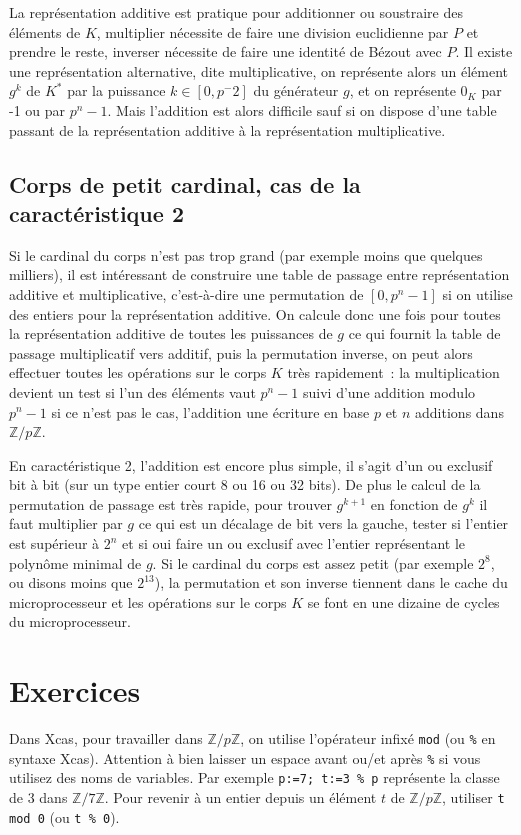 \documentclass[a4paper,11pt]{book}
\begin{document}
\begin{giacjshere}
La repr\'esentation additive est pratique pour additionner
ou soustraire des \'el\'ements de $K$, multiplier
n\'ecessite de faire une division euclidienne par $P$ et prendre
le reste, inverser n\'ecessite de faire une identit\'e de B\'ezout
avec $P$. Il existe une repr\'esentation alternative, dite
multiplicative, on repr\'esente alors un \'el\'ement $g^k$ de $K^*$
par la puissance $k \in [0,p^-2]$ du g\'en\'erateur $g$, et on
repr\'esente $0_K$ par -1 ou par $p^n-1$. Mais l'addition
est alors difficile sauf si on dispose d'une table passant
de la repr\'esentation additive \`a la repr\'esentation
multiplicative.

\subsection{Corps de petit cardinal, cas de la caract\'eristique 2}
Si le cardinal du corps n'est pas trop grand (par exemple
moins que quelques milliers), il est int\'eressant de construire
une table de passage entre repr\'esentation additive et
multiplicative, c'est-\`a-dire une permutation de $[0,p^n-1]$
si on utilise des entiers pour la repr\'esentation additive.
On calcule donc une fois pour toutes la repr\'esentation additive
de toutes les puissances de $g$ ce qui fournit la table de passage
multiplicatif vers additif, puis la permutation inverse, on peut alors
effectuer toutes les op\'erations sur le corps $K$ tr\`es
rapidement~: la multiplication devient un test si l'un
des \'el\'ements vaut $p^n-1$ suivi d'une addition modulo $p^n-1$ si
ce n'est pas le cas, l'addition une \'ecriture en base $p$ et $n$
additions dans $\mathbb{Z}/p\mathbb{Z}$.

En caract\'eristique 2, l'addition est encore plus simple, il s'agit
d'un ou exclusif bit \`a bit (sur un type entier court 8 ou 16 ou 32 bits). 
De plus le calcul de la permutation
de passage est tr\`es rapide, pour trouver $g^{k+1}$ en fonction
de $g^k$ il faut multiplier par $g$ ce qui est un d\'ecalage
de bit vers la gauche, tester si l'entier est sup\'erieur \`a $2^n$
et si oui faire un ou exclusif avec l'entier repr\'esentant le
polyn\^ome minimal de $g$. Si le cardinal du corps est assez petit
(par exemple $2^8$, ou disons moins que $2^{13}$),
la permutation et son inverse tiennent dans le cache du
microprocesseur et les op\'erations sur le corps $K$ se font
en une dizaine de cycles du microprocesseur.

\pagebreak

\section{Exercices}
Dans Xcas, pour travailler dans $\mathbb{Z}/p\mathbb{Z}$, on utilise l'op\'erateur infix\'e \verb|mod| (ou \verb|%| en syntaxe Xcas).
Attention \`a bien laisser un espace avant ou/et apr\`es \verb|%| si vous 
utilisez des noms de variables. Par exemple \verb|p:=7; t:=3 % p| repr\'esente
la classe de 3 dans $\mathbb{Z}/7\mathbb{Z}$.
Pour revenir \`a un entier depuis un \'el\'ement $t$ 
de $\mathbb{Z}/p\mathbb{Z}$, utiliser \verb|t mod 0| (ou \verb|t % 0|).


\end{giacjshere}
\end{document}

